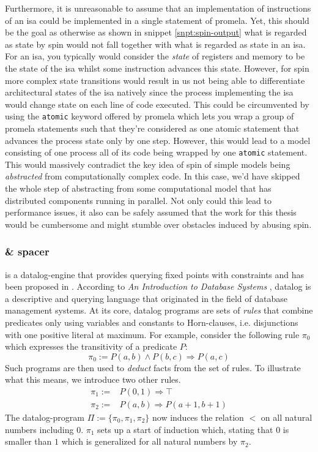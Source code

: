 Furthermore, it is unreasonable to assume that an implementation of instructions of an \gls{isa} could be implemented in a single statement of \gls{promela}.
Yet, this should be the goal as otherwise as shown in snippet \ref{snpt:spin-output} what is regarded as state by \gls{spin} would not fall together with what is regarded as state in an \gls{isa}.
For an \gls{isa}, you typically would consider the \textit{state} of registers and memory to be the state of the \gls{isa} whilst some instruction advances this state.
However, for \gls{spin} more complex state transitions would result in us not being able to differentiate architectural states of the \gls{isa} natively since the process implementing the \gls{isa} would change state on each line of code executed.
This could be circumvented by using the \lstinline{atomic} keyword offered by \gls{promela} which lets you wrap a group of \gls{promela} statements such that they're considered as one atomic statement that advances the process state only by one step.
However, this would lead to a model consisting of one process all of its code being wrapped by one \lstinline{atomic} statement.
This would massively contradict the key idea of \gls{spin} of simple models being \textit{abstracted} from computationally complex code.
In this case, we'd have skipped the whole step of abstracting from some computational model that has distributed components running in parallel.
Not only could this lead to performance issues, it also can be safely assumed that the work for this thesis would be cumbersome and might stumble over obstacles induced by abusing \gls{spin}.

\subsubsection{\muZ{} \& \gls{spacer}}

\muZ{} is a \gls{datalog}-engine that provides querying fixed points with constraints and has been proposed in \cite{Hoder11}.
According to \textit{An Introduction to Database Systems} \cite[p.790ff]{Date00}, \gls{datalog} is a descriptive and querying language that originated in the field of database management systems.
At its core, \gls{datalog} programs are sets of \textit{rules} that combine predicates only using variables and constants to Horn-clauses, i.e. disjunctions with one positive literal at maximum.
For example, consider the following rule $ \pi_0 $ which expresses the transitivity of a predicate $ P $:
\begin{equation*}
    \pi_0 := P(a, b) \land P(b, c) \Rightarrow P(a, c)
\end{equation*}
Such programs are then used to \textit{deduct} facts from the set of rules.
To illustrate what this means, we introduce two other rules.
\begin{align*}
    \pi_1 := & P(0, 1) \Rightarrow \top \\
    \pi_2 := & P(a, b) \Rightarrow P(a + 1, b + 1)
\end{align*}
The \gls{datalog}-program $ \Pi := \{ \pi_0, \pi_1, \pi_2 \} $ now induces the relation $ < $ on all natural numbers including $ 0 $.
$ \pi_1 $ sets up a start of induction which, stating that $ 0 $ is smaller than $ 1 $ which is generalized for all natural numbers by $ \pi_2 $.

